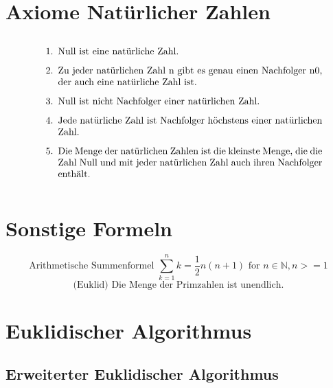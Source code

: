 \section{Axiome Natürlicher Zahlen}
\begin{equation}
    \parbox{30em}{
        \begin{enumerate}
            \item Null ist eine natürliche Zahl.
            \item Zu jeder natürlichen Zahl n gibt es genau einen Nachfolger n0, der auch eine 
            natürliche Zahl ist.
            \item Null ist nicht Nachfolger einer natürlichen Zahl. 
            \item Jede natürliche Zahl ist Nachfolger höchstens einer natürlichen Zahl.
            \item Die Menge der natürlichen Zahlen ist die kleinste Menge, die die Zahl Null und 
            mit jeder natürlichen Zahl auch ihren Nachfolger enthält.
        \end{enumerate}
    }
\end{equation}

\section{Sonstige Formeln}
\begin{equation}
    \text{Arithmetische Summenformel } \sum_{k=1}^{n}{k} = \frac{1}{2} n (n+1) \text{ for } n \in \mathbb{N}, n >= 1
\end{equation}
\begin{equation}
    \text{(Euklid) Die Menge der Primzahlen ist unendlich.}
\end{equation}

\section{Euklidischer Algorithmus}
\subsection{Erweiterter Euklidischer Algorithmus}
